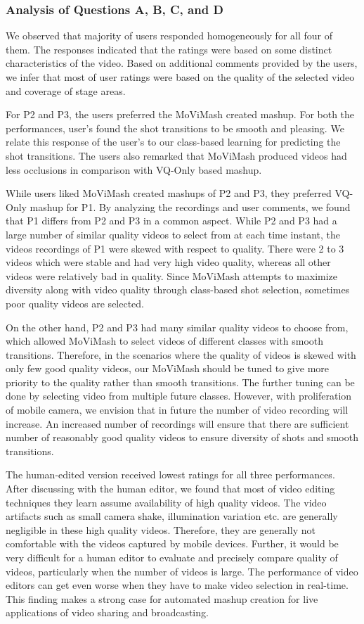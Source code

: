 \documentclass{sig-alternate-05-2015}
\begin{document}
\subsubsection{Analysis of Questions A, B, C, and D}
We observed that majority of users responded homogeneously
for all four of them. The responses indicated that the ratings were
based on some distinct characteristics of the video. Based on additional comments provided by the users, we infer that most of user
ratings were based on the quality of the selected video and coverage
of stage areas.

For P2 and P3, the users preferred the MoViMash created mashup.
For both the performances, user's found the shot transitions to be
smooth and pleasing. We relate this response of the user's to our
class-based learning for predicting the shot transitions. The users
also remarked that MoViMash produced videos had less occlusions
in comparison with VQ-Only based mashup.

While users liked MoViMash created mashups of P2 and P3,
they preferred VQ-Only mashup for P1. By analyzing the recordings and user comments, we found that P1 differs from P2 and P3 in
a common aspect. While P2 and P3 had a large number of similar
quality videos to select from at each time instant, the videos recordings of P1 were skewed with respect to quality. There were 2 to 3
videos which were stable and had very high video quality, whereas
all other videos were relatively bad in quality. Since MoViMash
attempts to maximize diversity along with video quality through
class-based shot selection, sometimes poor quality videos are selected.

On the other hand, P2 and P3 had many similar quality videos
to choose from, which allowed MoViMash to select videos of different classes with smooth transitions. Therefore, in the scenarios
where the quality of videos is skewed with only few good quality
videos, our MoViMash should be tuned to give more priority to
the quality rather than smooth transitions. The further tuning can
be done by selecting video from multiple future classes. However,
with proliferation of mobile camera, we envision that in future the
number of video recording will increase. An increased number of
recordings will ensure that there are sufficient number of reasonably good quality videos to ensure diversity of shots and smooth
transitions.

The human-edited version received lowest ratings for all three
performances. After discussing with the human editor, we found
that most of video editing techniques they learn assume availability
of high quality videos. The video artifacts such as small camera shake, illumination variation etc. are generally negligible in these
high quality videos. Therefore, they are generally not comfortable
with the videos captured by mobile devices. Further, it would be
very difficult for a human editor to evaluate and precisely compare
quality of videos, particularly when the number of videos is large.
The performance of video editors can get even worse when they
have to make video selection in real-time. This finding makes a
strong case for automated mashup creation for live applications of
video sharing and broadcasting.
\end{document}
